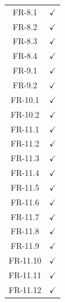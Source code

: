\documentclass{article}
\begin{document}
\begin{table}[ht]
\begin{tabular}{@{}ll@{}}
        \multicolumn{1}{c}{FR-8.1} & \multicolumn{1}{c}{$\checkmark$} \\ 
        \multicolumn{1}{c}{FR-8.2} & \multicolumn{1}{c}{$\checkmark$} \\ 
        \multicolumn{1}{c}{FR-8.3} & \multicolumn{1}{c}{$\checkmark$} \\ 
        \multicolumn{1}{c}{FR-8.4} & \multicolumn{1}{c}{$\checkmark$} \\ 
        \multicolumn{1}{c}{FR-9.1} & \multicolumn{1}{c}{$\checkmark$} \\ 
        \multicolumn{1}{c}{FR-9.2} & \multicolumn{1}{c}{$\checkmark$} \\ 
        \multicolumn{1}{c}{FR-10.1} & \multicolumn{1}{c}{$\checkmark$} \\ 
        \multicolumn{1}{c}{FR-10.2} & \multicolumn{1}{c}{$\checkmark$} \\ 
        \multicolumn{1}{c}{FR-11.1} & \multicolumn{1}{c}{$\checkmark$} \\ 
        \multicolumn{1}{c}{FR-11.2} & \multicolumn{1}{c}{$\checkmark$} \\ 
        \multicolumn{1}{c}{FR-11.3} & \multicolumn{1}{c}{$\checkmark$} \\ 
        \multicolumn{1}{c}{FR-11.4} & \multicolumn{1}{c}{$\checkmark$} \\ 
        \multicolumn{1}{c}{FR-11.5} & \multicolumn{1}{c}{$\checkmark$} \\ 
        \multicolumn{1}{c}{FR-11.6} & \multicolumn{1}{c}{$\checkmark$} \\ 
        \multicolumn{1}{c}{FR-11.7} & \multicolumn{1}{c}{$\checkmark$} \\ 
        \multicolumn{1}{c}{FR-11.8} & \multicolumn{1}{c}{$\checkmark$} \\ 
        \multicolumn{1}{c}{FR-11.9} & \multicolumn{1}{c}{$\checkmark$} \\ 
        \multicolumn{1}{c}{FR-11.10} & \multicolumn{1}{c}{$\checkmark$} \\ 
        \multicolumn{1}{c}{FR-11.11} & \multicolumn{1}{c}{$\checkmark$} \\ 
        \multicolumn{1}{c}{FR-11.12} & \multicolumn{1}{c}{$\checkmark$} \\ \bottomrule
    \end{tabular}
\end{table}
\end{document}
